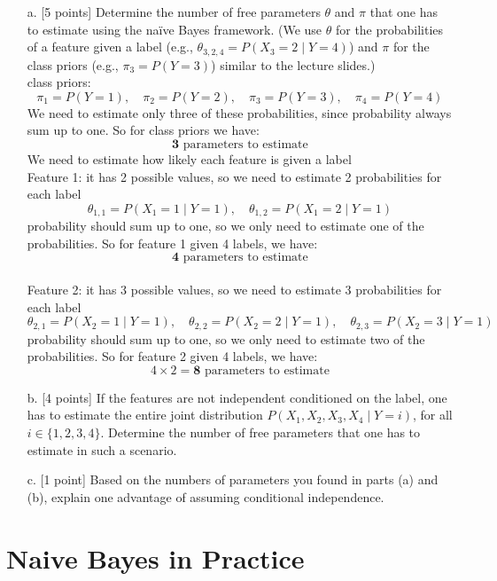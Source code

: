 \documentclass[a3paper,12pt]{extarticle} %
\begin{document}
\begin{enumerate}
    \item[a.] [5 points] Determine the number of free parameters $\theta$ and $\pi$ that one has to estimate using the na\"ive Bayes framework. (We use $\theta$ for the probabilities of a feature given a label (e.g., $\theta_{3,2,4} = P(X_3 = 2 \mid Y = 4)$) and $\pi$ for the class priors (e.g., $\pi_3 = P(Y = 3)$) similar to the lecture slides.)
    \\ class priors:
    \[
        \pi_1 = P(Y = 1), \quad \pi_2 = P(Y = 2), \quad \pi_3 = P(Y = 3), \quad \pi_4 = P(Y = 4)
    \]
    We need to estimate only three of these probabilities, since probability always sum up to one. So for class priors we have:
    \[
         \textbf{3}\text{  parameters to estimate}
    \]
    We need to estimate how likely each feature is given a label
    \\ Feature 1: it has 2 possible values, so we need to estimate 2 probabilities for each label
    \[
        \theta_{1,1} = P(X_1 = 1 \mid Y = 1), \quad \theta_{1,2} = P(X_1 = 2 \mid Y = 1)
    \]
    probability should sum up to one, so we only need to estimate one of the probabilities. So for feature 1 given 4 labels, we have:
    \[
        \textbf{4}\text{  parameters to estimate}
    \]
    \\ Feature 2: it has 3 possible values, so we need to estimate 3 probabilities for each label
    \[
        \theta_{2,1} = P(X_2 = 1 \mid Y = 1), \quad \theta_{2,2} = P(X_2 = 2 \mid Y = 1), \quad \theta_{2,3} = P(X_2 = 3 \mid Y = 1)
    \]
    probability should sum up to one, so we only need to estimate two of the probabilities. So for feature 2 given 4 labels, we have:
    \[
        4 \times 2 = \textbf{8}\text{  parameters to estimate}
    \]

    \item[b.] [4 points] If the features are not independent conditioned on the label, one has to estimate the entire joint distribution $P(X_1, X_2, X_3, X_4 \mid Y = i)$, for all $i \in \{1, 2, 3, 4\}$. Determine the number of free parameters that one has to estimate in such a scenario.
    \item[c.] [1 point] Based on the numbers of parameters you found in parts (a) and (b), explain one advantage of assuming conditional independence.
\end{enumerate}
\newpage
\section{Naive Bayes in Practice}
\end{document}
